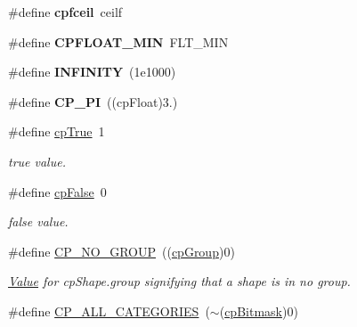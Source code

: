 \begin{DoxyCompactItemize}
\#define {\bfseries cpfceil}~ceilf
\item 
\mbox{\label{group__basicTypes_ga9885777f2bb284bc9148d0b8031e620e}} 
\#define {\bfseries C\+P\+F\+L\+O\+A\+T\+\_\+\+M\+IN}~F\+L\+T\+\_\+\+M\+IN
\item 
\mbox{\label{group__basicTypes_ga956e2723d559858d08644ac99146e910}} 
\#define {\bfseries I\+N\+F\+I\+N\+I\+TY}~(1e1000)
\item 
\mbox{\label{group__basicTypes_ga45b75a58ad00a44f105ce2703dde3716}} 
\#define {\bfseries C\+P\+\_\+\+PI}~((cp\+Float)3.)
\item 
\mbox{\label{group__basicTypes_gae30fc24a6e711797b9d39efa0e999987}} 
\#define \hyperlink{group__basicTypes_gae30fc24a6e711797b9d39efa0e999987}{cp\+True}~1
\begin{DoxyCompactList}\small\item\em true value. \end{DoxyCompactList}\item 
\mbox{\label{group__basicTypes_ga4b0cfe38ff97abec3400f9bb7e18f21e}} 
\#define \hyperlink{group__basicTypes_ga4b0cfe38ff97abec3400f9bb7e18f21e}{cp\+False}~0
\begin{DoxyCompactList}\small\item\em false value. \end{DoxyCompactList}\item 
\mbox{\label{group__basicTypes_gabd2870d269e0288b26b045c81a07acc8}} 
\#define \hyperlink{group__basicTypes_gabd2870d269e0288b26b045c81a07acc8}{C\+P\+\_\+\+N\+O\+\_\+\+G\+R\+O\+UP}~((\hyperlink{group__basicTypes_gacd811b1135a8f4a3e5cc019552b18b1a}{cp\+Group})0)
\begin{DoxyCompactList}\small\item\em \hyperlink{classValue}{Value} for cp\+Shape.\+group signifying that a shape is in no group. \end{DoxyCompactList}\item 
\mbox{\label{group__basicTypes_ga591693fbd3ed24f3365ef7accf349d4f}} 
\#define \hyperlink{group__basicTypes_ga591693fbd3ed24f3365ef7accf349d4f}{C\+P\+\_\+\+A\+L\+L\+\_\+\+C\+A\+T\+E\+G\+O\+R\+I\+ES}~($\sim$(\hyperlink{group__basicTypes_gae7ff94f62e00cae288c1991958822743}{cp\+Bitmask})0)

\end{DoxyCompactItemize}

